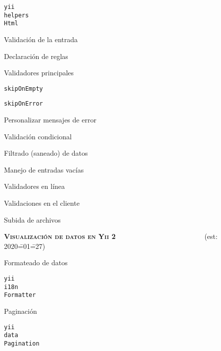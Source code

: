 \begin{longenum}
\begin{longenum}
\begin{longenum}
            \item \texttt{yii\\helpers\\Html}
        \end{longenum}
        \item Validación de la entrada
        \begin{longenum}
            \item Declaración de reglas
            \begin{longenum}
                \item Validadores principales
                \item \texttt{skipOnEmpty}
                \item \texttt{skipOnError}
                \item Personalizar mensajes de error
                \item Validación condicional
                \item Filtrado (saneado) de datos
                \item Manejo de entradas vacías
            \end{longenum}
            \item Validadores en línea
            \item Validaciones en el cliente \opcional\
        \end{longenum}
        \item Subida de archivos
    \end{longenum}
    \item \textbf{\textsc{Visualización de datos en Yii 2}} \ \ \ \ \ \ \ \ \ \ \ \ \ \ \ \ \ \ \ \ \ \ \ \ \ (est: 2020\==01\==27)
    \begin{longenum}
        \item Formateado de datos
        \begin{longenum}
            \item \texttt{yii\\i18n\\Formatter}
        \end{longenum}
        \item Paginación
        \begin{longenum}
            \item \texttt{yii\\data\\Pagination}

\end{longenum}
\end{longenum}
\end{longenum}
